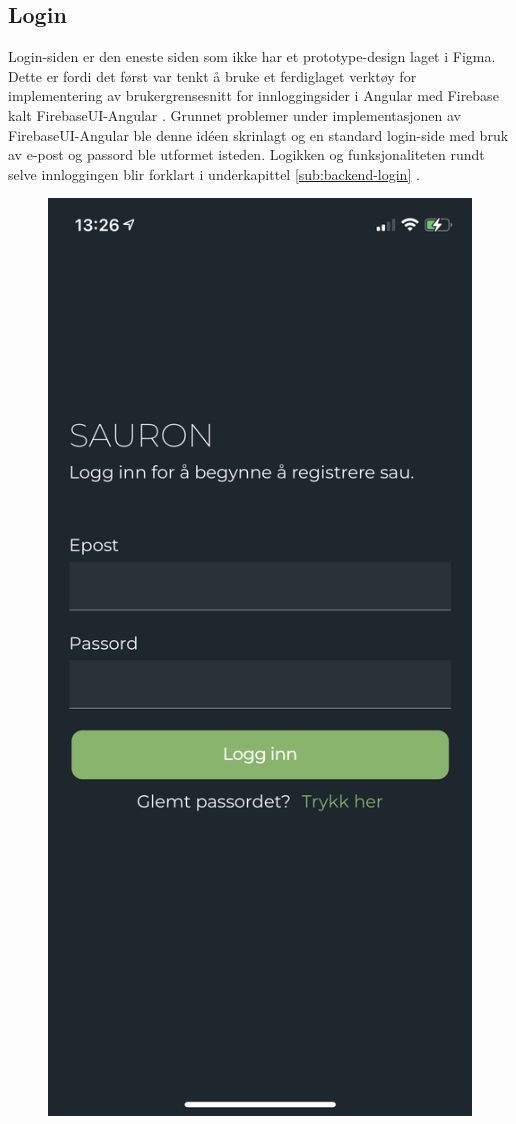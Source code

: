\subsection{Login}
Login-siden er den eneste siden som ikke har et prototype-design laget i Figma. Dette er fordi det først var tenkt å bruke et ferdiglaget verktøy for implementering av brukergrensesnitt for innloggingsider i Angular med Firebase kalt FirebaseUI-Angular \cite{jenniRaphaelJenniFirebaseUIAngular2021}. Grunnet problemer under implementasjonen av FirebaseUI-Angular ble denne idéen skrinlagt og en standard login-side med bruk av e-post og passord ble utformet isteden. Logikken og funksjonaliteten rundt selve innloggingen blir forklart i underkapittel \ref{sub:backend-login} .
\begin{figure}[H]
\centering
\captionsetup{width=.8\linewidth}
\includegraphics[scale=0.4]{Figurer/skjermbilder/login.png}

\end{figure}
